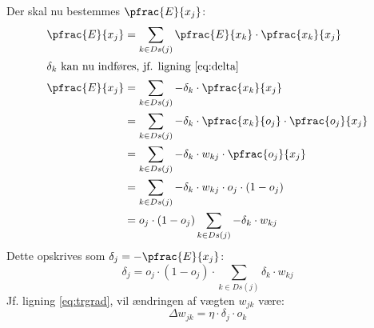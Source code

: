 \documentclass[../SOP.tex]{subfile}
\begin{document}
Der skal nu bestemmes $\pfrac{E}{x_j}$:
\begin{align*}
  \pfrac{E}{x_j}&=\sum_{k\in Ds(j)} \pfrac{E}{x_k}\cdot \pfrac{x_k}{x_j}\\
  \intertext{$\delta_k$ kan nu indføres, jf. ligning \ref{eq:delta}}
  \pfrac{E}{x_j}&=\sum_{k\in Ds(j)} -\delta_k\cdot \pfrac{x_k}{x_j}\\
  &= \sum_{k\in Ds(j)} -\delta_k \cdot \pfrac{x_k}{o_j}\cdot\pfrac{o_j}{x_j}\\
  &= \sum_{k\in Ds(j)} -\delta_k \cdot w_{kj}\cdot \pfrac{o_j}{x_j}\\
  &= \sum_{k\in Ds(j)} -\delta_k \cdot w_{kj}\cdot o_j\cdot(1-o_j)\\
  &= o_j\cdot(1-o_j)\sum_{k\in Ds(j)} -\delta_k \cdot w_{kj}
\end{align*}
Dette opskrives som $\delta_j=-\pfrac{E}{x_j}$:
\begin{equation}
  \delta_j=o_j\cdot(1-o_j)\cdot\sum_{k\in Ds(j)} \delta_k\cdot w_{kj} 
  \label{eq:delta_h}
\end{equation}
Jf. ligning \ref{eq:trgrad}, vil ændringen af vægten $w_{jk}$ være:
\begin{equation}
  \Delta w_{jk}=\eta\cdot \delta_j\cdot o_{k}
  \label{eq:wchange}
\end{equation}
\end{document}
